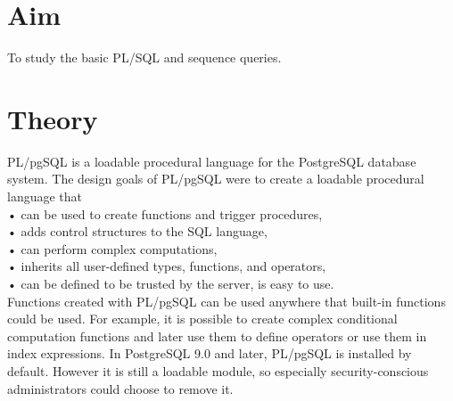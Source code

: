 \documentclass[13pt,oneside]{book}
\begin{document}
							\section*{Aim}
							\large To study the basic PL/SQL and sequence queries.
							\section*{Theory}
							PL/pgSQL is a loadable procedural language for the PostgreSQL database system.
The design goals of PL/pgSQL were to create a loadable procedural language that \\
• can be used to create functions and trigger procedures,\\
• adds control structures to the SQL language,\\
• can perform complex computations,\\
• inherits all user-defined types, functions, and operators,\\
• can be defined to be trusted by the server, is easy to use.\\
Functions created with PL/pgSQL can be used anywhere that built-in functions
could be used. For example, it is possible to create complex conditional computation
functions and later use them to define operators or use them in index expressions.
In PostgreSQL 9.0 and later, PL/pgSQL is installed by default.
However it is still a loadable module, so especially security-conscious
administrators could choose to remove it.
							
\end{document}

